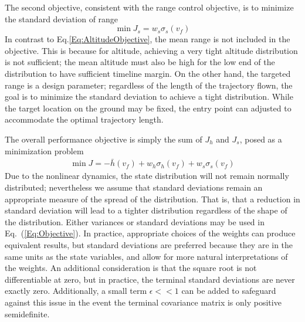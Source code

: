 The second objective, consistent with the range control objective, is to minimize the standard deviation of range 
\begin{equation}
	\min J_s = w_s\sigma_s(v_f) \label{Eq:RangeObjective}
\end{equation}
In contrast to Eq.\eqref{Eq:AltitudeObjective}, the mean range is not included in the objective. This is because for altitude, achieving a very tight altitude distribution is not sufficient; the mean altitude must also be high for the low end of the distribution to have sufficient timeline margin. On the other hand, the targeted range is a design parameter; regardless of the length of the trajectory flown, the goal is to minimize the standard deviation to achieve a tight distribution. While the target location on the ground may be fixed, the entry point can adjusted to accommodate the optimal trajectory length. 

The overall performance objective is simply the sum of $J_h$ and $J_s$, posed as a minimization problem
\begin{align}
	\min J = -\bar{h}(v_f) + w_h\sigma_h(v_f) + w_s\sigma_s(v_f) \label{Eq:Objective}
\end{align}
Due to the nonlinear dynamics, the state distribution will not remain normally distributed; nevertheless we assume that standard deviations remain an appropriate measure of the spread of the distribution. That is, that a reduction in standard deviation will lead to a tighter distribution regardless of the shape of the distribution. Either variances or standard deviations may be used in Eq.~(\ref{Eq:Objective}). In practice, appropriate choices of the weights can produce equivalent results, but standard deviations are preferred because they are in the same units as the state variables, and allow for more natural interpretations of the weights. An additional consideration is that the square root is not differentiable at zero, but in practice, the terminal standard deviations are never exactly zero. Additionally, a small term $\epsilon<<1$ can be added to safeguard against this issue in the event the terminal covariance matrix is only positive semidefinite.


